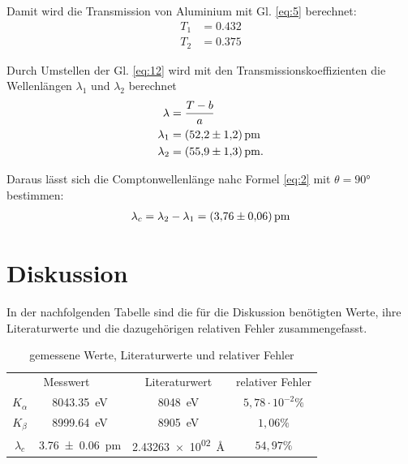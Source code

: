 Damit wird die Transmission von Aluminium mit Gl. \eqref{eq:5} berechnet:
\begin{subequations}
\begin{align}
    T_1 &= 0.432 \label{16a}\\
    T_2 &= 0.375 \label{16b} 
\end{align}
\end{subequations}

Durch Umstellen der Gl. \eqref{eq:12} wird mit den Transmissionskoeffizienten
die Wellenlängen $\lambda _1$ und $\lambda _2$ berechnet
\begin{subequations}
\begin{align}
    \lambda &= \frac{T-b}{a} \label{17a}\\
    \lambda _1 &= \SI{52.2+-1.2}{\pico\meter} \label{17b}\\
    \lambda _2 &= \SI{55.9+-1.3}{\pico\meter} \label{17c}.
\end{align}
\end{subequations}

Daraus lässt sich die Comptonwellenlänge nahc Formel \eqref{eq:2} mit $\theta = 90°$
bestimmen:
\begin{align}
    \lambda _c = \lambda _2 - \lambda _1 = \SI{3.76+-0.06}{\pico\meter} \label{eq:18}
\end{align}



\section{Diskussion}

In der nachfolgenden Tabelle sind die für die Diskussion benötigten Werte, ihre Literaturwerte und
die dazugehörigen relativen Fehler zusammengefasst.
\begin{table}[H]
\centering
\begin{tabular}{c c c c}
\toprule
\multicolumn{2}{c}{Messwert}& \multicolumn{1}{c}{Literaturwert}& \multicolumn{1}{c}{relativer Fehler} \\
\cmidrule(lr){1-4} 
$K_{\alpha}$    &   \SI{8043.35}{\electronvolt} & \SI{8048}{\electronvolt} \cite{K_Linie} & $5,78\cdot 10^{-2 }\%$\\
$K_{\beta} $    &   \SI{8999.64}{\electronvolt} & \SI{8905}{\electronvolt} \cite{K_Linie} & $1,06\%$\\
$\lambda _c$    &   \SI{3.76+-0.06}{\pico\meter} & \SI{2.43263e02}{\angstrom} \cite{nolting2013grundlagen} & $54,97\%$\\
\bottomrule
\end{tabular}
\caption{gemessene Werte, Literaturwerte und relativer Fehler}
\label{tab:3}
\end{table}

